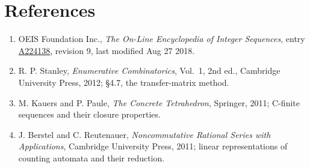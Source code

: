 \documentclass[11pt]{article}
\theoremstyle{definition}
\begin{document}
\section{References}

\begin{enumerate}

\item OEIS Foundation Inc., \emph{The On-Line Encyclopedia of Integer Sequences}, entry \href{https://oeis.org/A224138}{A224138}, revision 9, last modified Aug 27 2018.

\item R. P. Stanley, \emph{Enumerative Combinatorics}, Vol.~1, 2nd ed., Cambridge University Press, 2012; \S4.7, the transfer-matrix method.

\item M. Kauers and P. Paule, \emph{The Concrete Tetrahedron}, Springer, 2011; C-finite sequences and their closure properties.

\item J. Berstel and C. Reutenauer, \emph{Noncommutative Rational Series with Applications}, Cambridge University Press, 2011; linear representations of counting automata and their reduction.

\end{enumerate}
\end{document}
